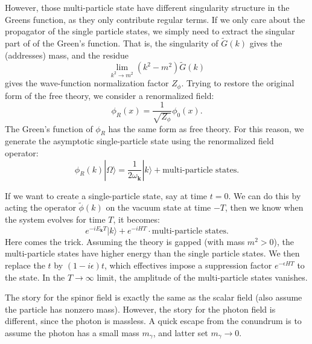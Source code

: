 \documentclass[aps,prb,superscriptaddress,nofootinbib]{revtex4}
\begin{document}
However, those multi-particle state have different singularity structure in the Greens function, as they only contribute regular terms.
If we only care about the propagator of the single particle states, we simply need to extract the singular part of of the Green's function.
That is, the singularity of $\tilde{G}(k)$ gives the (addresses) mass, and the residue 
\begin{equation*}
	\lim_{k^2 \rightarrow m^2} (k^2-m^2)\tilde{G}(k)
\end{equation*}
gives the wave-function normalization factor $Z_\phi$.
Trying to restore the original form of the free theory, we consider a renormalized field:
\begin{equation}
	\phi_R(x) = \frac{1}{\sqrt{Z_\phi}}\phi_0(x).
\end{equation}
The Green's function of $\phi_R$ has the same form as free theory.
For this reason, we generate the asymptotic single-particle state using the renormalized field operator:
\begin{equation}\label{eq:scalar-field-generate-particle}
	\phi_R(k)|\Omega\rangle = \frac{1}{2\omega_{\bm k}}|k\rangle + \text{multi-particle states}.
\end{equation}

If we want to create a single-particle state, say at time $t=0$.
We can do this by acting the operator $\tilde{\phi}(k)$ on the vacuum state at time $-T$, then we know when the system evolves for time $T$, it becomes:
\begin{equation}
	e^{-i E_{\bm k} T}|k\rangle + e^{-iHT} \cdot \text{multi-particle states}.
\end{equation}
Here comes the trick.
Assuming the theory is gapped (with mass $m^2>0$), the multi-particle states have higher energy than the single particle states.
We then replace the $t$ by $(1-i\epsilon)t$, which effectives impose a suppression factor $e^{-\epsilon H T}$ to the state.
In the $T\rightarrow \infty$ limit, the amplitude of the multi-particle states vanishes.

The story for the spinor field is exactly the same as the scalar field (also assume the particle has nonzero mass).
However, the story for the photon field is different, since the photon is massless.
A quick escape from the conundrum is to assume the photon has a small mass $m_\gamma$, and latter set $m_\gamma \rightarrow 0$.
\end{document}
